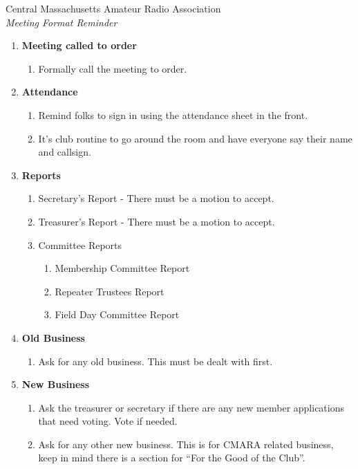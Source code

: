 \documentclass[10pt,letterpaper]{article}
\begin{document}
\begin{center}
{\Large Central Massachusetts Amateur Radio Association}\\
\emph{Meeting Format Reminder}
\end{center}

\begin{enumerate}

  \item \textbf{Meeting called to order}
  \begin{enumerate}
    \item Formally call the meeting to order.
  \end{enumerate}

  \item \textbf{Attendance}
  \begin{enumerate}
    \item Remind folks to sign in using the attendance sheet in the front.
    \item It's club routine to go around the room and have everyone say their name and callsign.
  \end{enumerate}

  \item \textbf{Reports}
  \begin{enumerate}
    \item Secretary's Report - There must be a motion to accept.
    \item Treasurer's Report - There must be a motion to accept.
    \item Committee Reports
    \begin{enumerate}
      \item Membership Committee Report
      \item Repeater Trustees Report
      \item Field Day Committee Report
    \end{enumerate}
  \end{enumerate}

  \item \textbf{Old Business}
  \begin{enumerate}
    \item Ask for any old business. This must be dealt with first.
  \end{enumerate}

  \item \textbf{New Business}
  \begin{enumerate}
    \item Ask the treasurer or secretary if there are any new member applications that need voting. Vote if needed.
    \item Ask for any other new business. This is for CMARA related business, keep in mind there is a section for ``For the Good of the Club''.
  \end{enumerate}


\end{enumerate}
\end{document}
